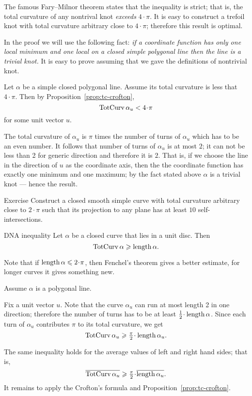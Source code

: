 The famous Fary--Milnor theorem states that the inequality is strict;
that is, the total curvature of any nontrival knot \emph{exceeds} $4\cdot\pi$.
It is easy to construct a trefoil knot with total curvature arbitrary close to $4\cdot\pi$;
therefore this result is optimal.

In the proof we will use the following fact: \emph{if a coordinate function has only one local minimum and one local on a closed simple polygonal line then the line is a trivial knot.}
It is easy to prove assuming that we gave the definitions of nontrivial knot. 

Let $\alpha$ be a simple closed polygonal line.
Assume its total curvature is less that $4\cdot\pi$.
Then by Proposition~\ref{prop:tc-crofton}, 
\[\tc\alpha_u<4\cdot\pi\]
for some unit vector $u$.

The total curvature of $\alpha_u$ is $\pi$ times the number of turns of $\alpha_u$
which has to be an even number.
It follows that number of turns of $\alpha_u$ is at most $2$;
it can not be less than 2 for generic direction and therefore it is $2$.
That is, if we choose the line in the direction of $u$ as the coordinate axis,
then the the coordinate function has exactly one minimum and one maximum;
by the fact stated above $\alpha$ is a trivial knot --- hence the result.
\qeds

\begin{thm}{Exercise}
Construct a closed smooth simple curve with total curvature arbitrary close to $2\cdot\pi$ such that its projection to any plane has at least $10$ self-intersections.   
\end{thm}


\begin{thm}{DNA inequality}
Let $\alpha$ be a closed curve that lies in a unit disc.
Then 
\[\mathop{\rm TotCurv}\nolimits\alpha\geqslant \mathop{\rm length}\nolimits\alpha.\]
\end{thm}

Note that if $\length\alpha\le2\cdot\pi$, then Fenchel's theorem gives a better estimate,
for longer curves it gives something new.

Assume $\alpha$ is a polygonal line.

Fix a unit vector $u$.
Note that the curve $\alpha_u$ can run at most length 2 in one direction;
therefore the number of turns has to be at least $\tfrac12\cdot\length\alpha$.
Since each turn of $\alpha_u$ contributes $\pi$ to its total curvature, we get
\[\tc\alpha_u\ge \tfrac\pi2\cdot\length\alpha_u.\]

The same inequality holds for the average values of left and right hand sides;
that is,
\[\overline{\tc\alpha_u}
\ge \tfrac\pi2\cdot\overline{\length\alpha_u}.\]
It remains to apply the Crofton's formula and Proposition~\ref{prop:tc-crofton}.

